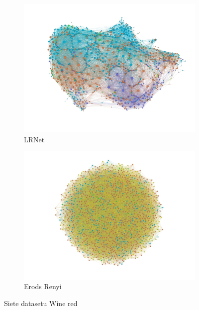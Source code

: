 \documentclass[slovak,master,dept460,male,cpp,cpdeclaration]{diploma}
\begin{document}
\begin{figure}[H]
\begin{subfigure}{0.45\textwidth}
    \includegraphics[width=\linewidth, frame]{Graphs/network_wine_red_lrnet.jpg}
    \caption{LRNet}
    \label{fig:wine_lrnet}
\end{subfigure}\hfil
\begin{subfigure}{0.45\textwidth}
    \centering
    \includegraphics[width=\linewidth, frame]{Graphs/network_wine_red_erdos_renyi.jpg}
    \caption{Erods Renyi}
    \label{fig:wine_erdos_renyi}
\end{subfigure}
\caption{Siete datasetu Wine red}
\label{fig:wine_networks}
\end{figure}
\end{document}
